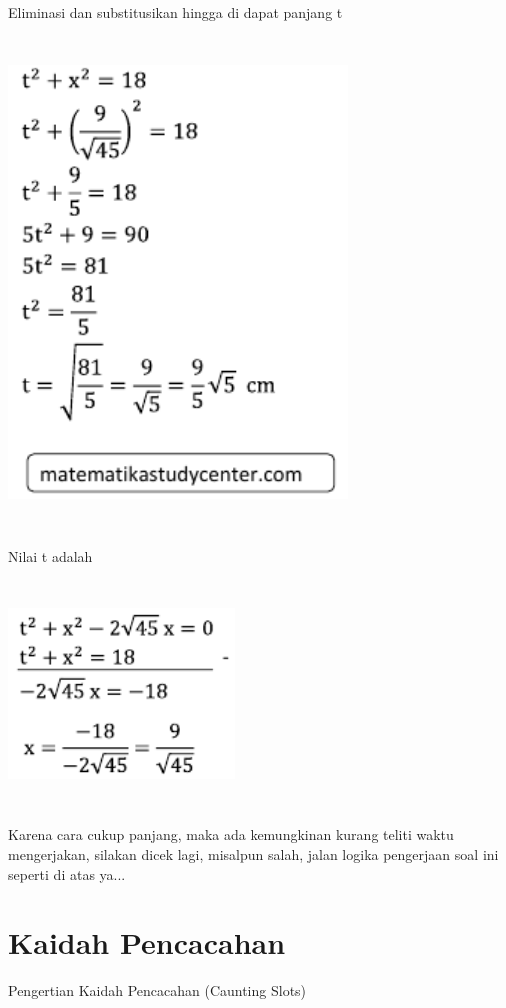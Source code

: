 \documentclass[11pt,fleqn]{book} %
\begin{document}
	Eliminasi dan substitusikan hingga di dapat panjang t 

	\includegraphics[width = 9cm, height= 13cm]{Pictures/dede23.png}
	
	Nilai t adalah
	
	\includegraphics[width = 6cm, height= 6cm]{Pictures/dede24.png}
	
	Karena cara cukup panjang, maka ada kemungkinan kurang teliti waktu mengerjakan, silakan dicek lagi, misalpun salah, jalan logika pengerjaan soal ini seperti di atas ya... 
	
	
\chapter{Kaidah Pencacahan}

Pengertian Kaidah Pencacahan (Caunting Slots)
\end{document}
